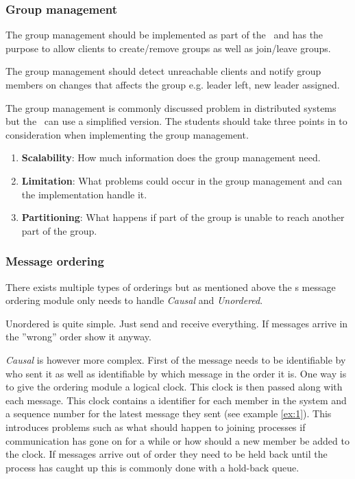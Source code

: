 \subsubsection{Group management}
The group management should be implemented as part of the \mw\ and has the purpose to allow clients to create/remove groups as well as join/leave groups.

The group management should detect unreachable clients and notify group members on changes that affects the group e.g. leader left, new leader assigned.

The group management is commonly discussed problem in distributed systems but the \mw\ can use a simplified version. The students should take three points in to consideration when implementing the group management.

\begin{enumerate}
	\item \textbf{Scalability}: How much information does the group management need.
	\item \textbf{Limitation}: What problems could occur in the group management and can the implementation handle it.
	\item \textbf{Partitioning}: What happens if part of the group is unable to reach another part of the group.
\end{enumerate}


\subsubsection{Message ordering}\label{sec:messageOrdering}
There exists multiple types of orderings but as mentioned above the \mw s message ordering module only needs to handle \textit{Causal} and \textit{Unordered}. 

Unordered is quite simple. Just send and receive everything. If messages arrive in the ''wrong'' order show it anyway.

\textit{Causal} is however more complex. First of the message needs to be identifiable by who sent it as well as identifiable by which message in the order it is. 
One way is to give the ordering module a logical clock. This clock is then passed along with each message. This clock contains a identifier for each member in the system and a sequence number for the latest message they sent (see example \ref{ex:1}). This introduces problems such as what should happen to joining processes if communication has gone on for a while or how should a new member be added to the clock. If messages arrive out of order they need to be held back until the process has caught up this is commonly done with a hold-back queue.


